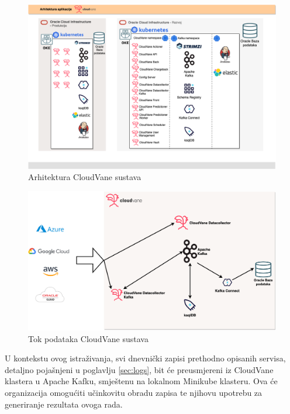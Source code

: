 \documentclass[times, utf8, diplomski]{fer}
\begin{document}
\clearpage
\begin{figure}[htb]
	\centering
	\includegraphics[width=15cm]{images/CloudVaneArchitecture.png}
	\caption[Arhitektura CloudVane sustava]{Arhitektura CloudVane sustava}
	\label{fig:cloudvaneArch}
\end{figure}

\begin{figure}[htb]
	\centering
	\includegraphics[width=15cm]{images/CloudVaneData.png}
	\caption[Tok podataka CloudVane sustava]{Tok podataka  CloudVane sustava}
	\label{fig:dataCloudvane}
\end{figure}

U kontekstu ovog istraživanja, svi dnevnički zapisi prethodno opisanih servisa, detaljno pojašnjeni u poglavlju \ref{sec:logs}, bit će preusmjereni iz CloudVane klastera u Apache Kafku, smještenu na lokalnom Minikube klasteru. Ova će organizacija omogućiti učinkovitu obradu zapisa te njihovu upotrebu za generiranje rezultata ovoga rada.
\end{document}

